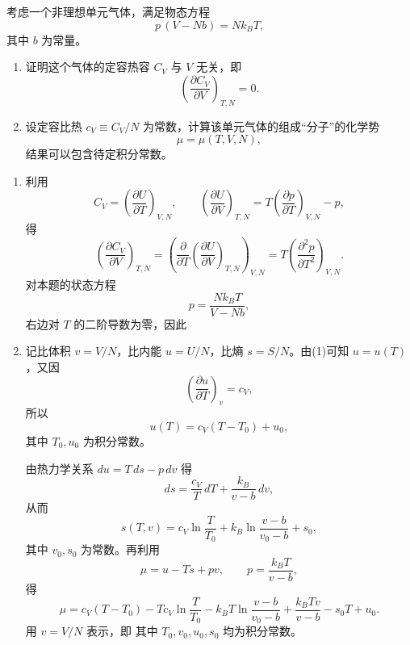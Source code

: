 ﻿


\begin{question}
考虑一个非理想单元气体，满足物态方程
\[
p\,(V-Nb)=Nk_B T,
\]
其中 $b$ 为常量。

\begin{enumerate}[label=(\arabic*),leftmargin=2.5em]
  \item 证明这个气体的定容热容 $C_V$ 与 $V$ 无关，即
  \[
  \left(\frac{\partial C_V}{\partial V}\right)_{T,N}=0.
  \]
  \item 设定容比热 $c_V\equiv C_V/N$ 为常数，计算该单元气体的组成“分子”的化学势
  \[
  \mu=\mu(T,V,N),
  \]
  结果可以包含待定积分常数。
\end{enumerate}

\begin{solution}
\begin{enumerate}[label=(\arabic*),leftmargin=2.5em]
  \item 利用
  \[
  C_V=\left(\frac{\partial U}{\partial T}\right)_{V,N},
  \qquad
  \left(\frac{\partial U}{\partial V}\right)_{T,N}
  =T\left(\frac{\partial p}{\partial T}\right)_{V,N}-p,
  \]
  得
  \[
  \left(\frac{\partial C_V}{\partial V}\right)_{T,N}
  =\left(\frac{\partial}{\partial T}\left(\frac{\partial U}{\partial V}\right)_{T,N}\right)_{V,N}
  =T\left(\frac{\partial^2 p}{\partial T^2}\right)_{V,N}.
  \]
  对本题的状态方程
  \[
  p=\frac{Nk_B T}{V-Nb},
  \]
  右边对 $T$ 的二阶导数为零，因此

  \item 记比体积 $v=V/N$，比内能 $u=U/N$，比熵 $s=S/N$。由(1)可知 $u=u(T)$，又因
  \[
  \left(\frac{\partial u}{\partial T}\right)_v=c_V,
  \]
  所以
  \[
  u(T)=c_V(T-T_0)+u_0,
  \]
  其中 $T_0,u_0$ 为积分常数。

  由热力学关系 $du=T\,ds-p\,dv$ 得
  \[
  ds=\frac{c_V}{T}\,dT+\frac{k_B}{v-b}\,dv,
  \]
  从而
  \[
  s(T,v)=c_V\ln\frac{T}{T_0}+k_B\ln\frac{v-b}{v_0-b}+s_0,
  \]
  其中 $v_0,s_0$ 为常数。再利用
  \[
  \mu=u-Ts+pv,
  \qquad p=\frac{k_B T}{v-b},
  \]
  得
  \[
  \mu=c_V(T-T_0)-Tc_V\ln\frac{T}{T_0}-k_B T\ln\frac{v-b}{v_0-b}
  +\frac{k_BTv}{v-b}-s_0T+u_0.
  \]
  用 $v=V/N$ 表示，即
  其中 $T_0,v_0,u_0,s_0$ 均为积分常数。
\end{enumerate}
\end{solution}
\end{question}

